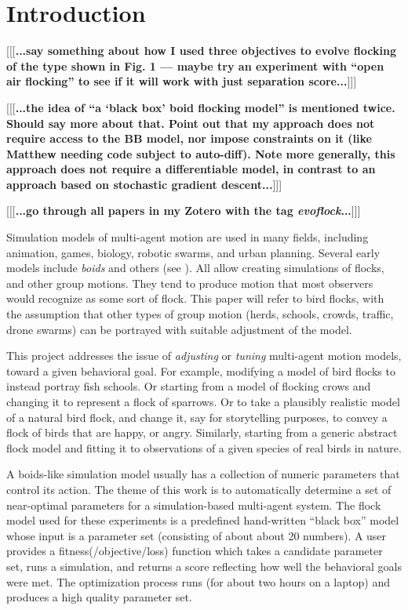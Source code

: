 \documentclass[letterpaper]{article}
\begin{document}

\section{Introduction}
\label{sec:intro}

[[[\textbf{...say something about how I used three objectives to evolve flocking of the type shown in Fig. 1 --- maybe try an experiment with ``open air flocking'' to see if it will work with just separation score...}]]]

[[[\textbf{...the idea of ``a `black box' boid flocking model'' is mentioned twice. Should say more about that. Point out that my approach does not require access to the BB model, nor impose constraints on it (like Matthew needing code subject to auto-diff). Note more generally, this approach does not require a differentiable model, in contrast to an approach based on stochastic gradient descent...}]]]

[[[\textbf{...go through all papers in my Zotero with the tag \textit{evoflock}...}]]]

Simulation models of multi-agent motion are used in many fields, including animation, games, biology, robotic swarms, and urban planning. Several early models include \textit{boids} \citep{reynolds_flocks_1987} and others (see ). All allow creating simulations of flocks, and other group motions.  They tend to produce motion that most observers would recognize as some sort of flock. This paper will refer to bird flocks, with the assumption that other types of group motion (herds, schools, crowds, traffic, drone swarms) can be portrayed with suitable adjustment of the model.

This project addresses the issue of \textit{adjusting} or \textit{tuning} multi-agent motion models, toward a given behavioral goal. For example, modifying a model of bird flocks to instead portray fish schools. Or starting from a model of flocking crows and changing it to represent a flock of sparrows. Or to take a plausibly realistic model of a natural bird flock, and change it, say for storytelling purposes, to convey a flock of birds that are happy, or angry. Similarly, starting from a generic abstract flock model and fitting it to observations of a given species of real birds in nature.

A boids-like simulation model usually has a collection of numeric parameters that control its action. The theme of this work is to automatically determine a set of near-optimal parameters for a simulation-based multi-agent system. The flock model used for these experiments is a predefined hand-written ``black box'' model whose input is a parameter set (consisting of about about 20 numbers). A user provides a fitness(/objective/loss) function which takes a candidate parameter set, runs a simulation, and returns a score reflecting how well the behavioral goals were met. The optimization process runs (for about two hours on a laptop) and produces a high quality parameter set.
\end{document}
